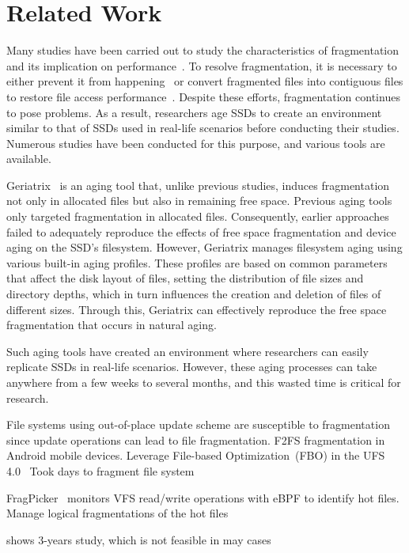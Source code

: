 \section{Related Work}
\label{s:related}

Many studies have been carried out to study the characteristics of fragmentation and its implication on performance~\cite{senescence:fast17,Problem_in_SSD_Empirical,Problem_in_SSD_Mobile_Devices,fsaging:hotstorage19}.
To resolve fragmentation, it is necessary to either prevent it from happening~\cite{no-afraid:fast24,Defragmentation_read_collision} or convert fragmented files into contiguous files to restore file access performance~\cite{defrag-lfs:apsys16,janusd:atc17,fragpicker:sosp21,parallel-defrag:sac22}.
Despite these efforts, fragmentation continues to pose problems.
As a result, researchers age SSDs to create an environment similar to that of SSDs used in real-life scenarios before conducting their studies.
Numerous studies have been conducted for this purpose, and various tools are available.

Geriatrix~\cite{geriatrix:atc18} is an aging tool that, unlike previous studies, induces fragmentation not only in allocated files but also in remaining free space.
Previous aging tools only targeted fragmentation in allocated files.
Consequently, earlier approaches failed to adequately reproduce the effects of free space fragmentation and device aging on the SSD's filesystem.
However, Geriatrix manages filesystem aging using various built-in aging profiles. These profiles are based on common parameters that affect the disk layout of files, setting the distribution of file sizes and directory depths, which in turn influences the creation and deletion of files of different sizes. Through this, Geriatrix can effectively reproduce the free space fragmentation that occurs in natural aging.


Such aging tools have created an environment where researchers can easily replicate SSDs in real-life scenarios.
However, these aging processes can take anywhere from a few weeks to several months, and this wasted time is critical for research.


File systems using out-of-place update scheme are susceptible to fragmentation since update operations can lead to file fragmentation.
\cite{f2fs-mobile:nvmsa24} F2FS fragmentation in Android mobile devices.
Leverage File-based Optimization~(FBO) in the UFS 4.0~\cite{ufs4.0}
Took days to fragment file system


FragPicker~\cite{fragpicker:sosp21} monitors VFS read/write operations with eBPF to identify hot files.
Manage logical fragmentations of the hot files


\cite{fs-aging:sigmetrics97} shows 3-years study, which is not feasible in may cases

